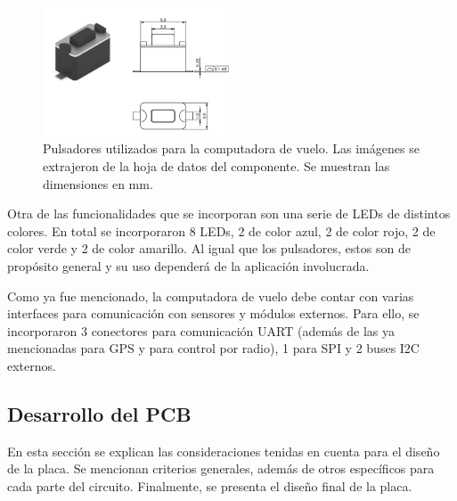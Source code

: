 \begin{figure}[htb]
    \centering
    \includegraphics[width=0.5\textwidth]{img/pulsadores.png}
    \caption{Pulsadores utilizados para la computadora de vuelo. Las imágenes se extrajeron de la hoja de datos del componente. Se muestran las dimensiones en mm.}
    \label{fig:pulsadores}    
\end{figure}



Otra de las funcionalidades que se incorporan son una serie de LEDs de distintos colores. En total se incorporaron 8 LEDs, 2 de color azul, 2 de color rojo, 2 de color verde y 2 de color amarillo. Al igual que los pulsadores, estos son de propósito general y su uso dependerá de la aplicación involucrada.

Como ya fue mencionado, la computadora de vuelo debe contar con varias interfaces para comunicación con sensores y módulos externos. Para ello, se incorporaron 3 conectores para comunicación UART (además de las ya mencionadas para GPS y para control por radio), 1 para SPI y 2 buses I2C externos.

\subsection{Desarrollo del PCB}

En esta sección se explican las consideraciones tenidas en cuenta para el diseño de la placa. Se mencionan criterios generales, además de otros específicos para cada parte del circuito. Finalmente, se presenta el diseño final de la placa.

